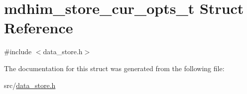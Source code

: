 \hypertarget{structmdhim__store__cur__opts__t}{\section{mdhim\-\_\-store\-\_\-cur\-\_\-opts\-\_\-t Struct Reference}
\label{d4/d09/structmdhim__store__cur__opts__t}
}


{\ttfamily \#include $<$data\-\_\-store.\-h$>$}



The documentation for this struct was generated from the following file\-:\begin{DoxyCompactItemize}
\item 
src/\hyperlink{data__store_8h}{data\-\_\-store.\-h}\end{DoxyCompactItemize}
